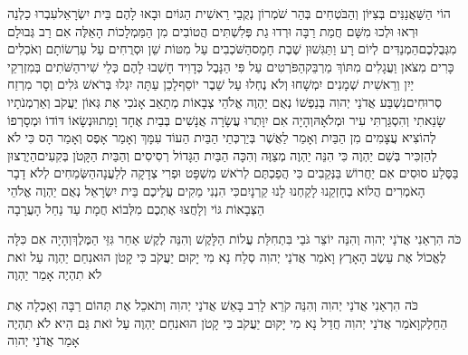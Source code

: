 \documentclass[../main/main.tex]{subfiles}
\begin{document}
\begin{multicols}{\ncols}
הוֹי הַשַּׁאֲנַנִּים בְּצִיּוֹן וְהַבֹּטְחִים בְּהַר שֹׁמְרוֹן נְקֻבֵי רֵאשִׁית הַגּוֹיִם וּבָאוּ לָהֶם בֵּית יִשְׂרָאֵל\PreVerseSpace{}עִבְרוּ כַלְנֵה וּרְאוּ וּלְכוּ מִשָּׁם חֲמַת רַבָּה וּרְדוּ גַת פְּלִשְׁתִּים הֲטוֹבִים מִן הַמַּמְלָכוֹת הָאֵלֶּה אִם רַב גְּבוּלָם מִגְּבֻלְכֶם\PreVerseSpace{}הַמְנַדִּים לְיוֹם רָע וַתַּגִּשׁוּן שֶׁבֶת חָמָס\PreVerseSpace{}הַשֹּׁכְבִים עַל מִטּוֹת שֵׁן וּסְרֻחִים עַל עַרְשׂוֹתָם וְאֹכְלִים כָּרִים מִצֹּאן וַעֲגָלִים מִתּוֹךְ מַרְבֵּק\PreVerseSpace{}הַפֹּרְטִים עַל פִּי הַנָּבֶל כְּדָוִיד חָשְׁבוּ לָהֶם כְּלֵי שִׁיר\PreVerseSpace{}הַשֹּׁתִים בְּמִזְרְקֵי יַיִן וְרֵאשִׁית שְׁמָנִים יִמְשָׁחוּ וְלֹא נֶחְלוּ עַל שֵׁבֶר יוֹסֵף\PreVerseSpace{}לָכֵן עַתָּה יִגְלוּ בְּרֹאשׁ גֹּלִים וְסָר מִרְזַח סְרוּחִים\PreVerseSpace{}נִשְׁבַּע אֲדֹנַי יְהוִה בְּנַפְשׁוֹ נְאֻם יַהְוֶה אֱלֹהֵי צְבָאוֹת מְתָאֵב אָנֹכִי אֶת גְּאוֹן יַעֲקֹב וְאַרְמְנֹתָיו שָׂנֵאתִי וְהִסְגַּרְתִּי עִיר וּמְלֹאָהּ\PreVerseSpace{}וְהָיָה אִם יִוָּתְרוּ עֲשָׂרָה אֲנָשִׁים בְּבַיִת אֶחָד וָמֵתוּ\PreVerseSpace{}וּנְשָׂאוֹ דּוֹדוֹ וּמְסָרְפוֹ לְהוֹצִיא עֲצָמִים מִן הַבַּיִת וְאָמַר לַאֲשֶׁר בְּיַרְכְּתֵי הַבַּיִת הַעוֹד עִמָּךְ וְאָמַר אָפֶס וְאָמַר הָס כִּי לֹא לְהַזְכִּיר בְּשֵׁם יַהְוֶה \ClosedSection{}כִּי הִנֵּה יַהְוֶה מְצַוֶּה וְהִכָּה הַבַּיִת הַגָּדוֹל רְסִיסִים וְהַבַּיִת הַקָּטֹן בְּקִעִים\PreVerseSpace{}הַיְרֻצוּן בַּסֶּלַע סוּסִים אִם יַחֲרוֹשׁ בַּנְּקֵבִים\SubEnd{} כִּי הֲפַכְתֶּם לְרֹאשׁ מִשְׁפָּט וּפְרִי צְדָקָה לְלַעֲנָה\PreVerseSpace{}הַשְּׂמֵחִים לְלֹא דָבָר הָאֹמְרִים הֲלוֹא בְחָזְקֵנוּ לָקַחְנוּ לָנוּ קַרְנָיִם\PreVerseSpace{}כִּי הִנְנִי מֵקִים עֲלֵיכֶם בֵּית יִשְׂרָאֵל נְאֻם יַהְוֶה אֱלֹהֵי הַצְּבָאוֹת גּוֹי וְלָחֲצוּ אֶתְכֶם מִלְּבוֹא חֲמָת עַד נַחַל הָעֲרָבָה\OpenSection{}\par
{}כֹּה הִרְאַנִי אֲדֹנַי יְהוִה וְהִנֵּה יוֹצֵר גֹּבַי בִּתְחִלַּת עֲלוֹת הַלָּקֶשׁ וְהִנֵּה לֶקֶשׁ אַחַר גִּזֵּי הַמֶּלֶךְ\PreVerseSpace{}וְהָיָה אִם כִּלָּה לֶאֱכוֹל אֶת עֵשֶׂב הָאָרֶץ וָאֹמַר אֲדֹנַי יְהוִה סְלַח נָא מִי יָקוּם יַעֲקֹב כִּי קָטֹן הוּא\PreVerseSpace{}נִחַם יַהְוֶה עַל זֹאת לֹא תִהְיֶה אָמַר יַהְוֶה\OpenSection{}\par
{}כֹּה הִרְאַנִי אֲדֹנַי יְהוִה וְהִנֵּה קֹרֵא לָרִב בָּאֵשׁ אֲדֹנַי יְהוִה וְתֹאכֵל\SubEnd{} אֶת תְּהוֹם רַבָּה וְאָכְלָה אֶת הַחֵלֶק\PreVerseSpace{}וָאֹמַר אֲדֹנַי יְהוִה חֲדַל נָא מִי יָקוּם יַעֲקֹב כִּי קָטֹן הוּא\PreVerseSpace{}נִחַם יַהְוֶה עַל זֹאת גַּם הִיא לֹא תִהְיֶה אָמַר אֲדֹנַי יְהוִה\OpenSection{}\par

\end{multicols}
\end{document}
